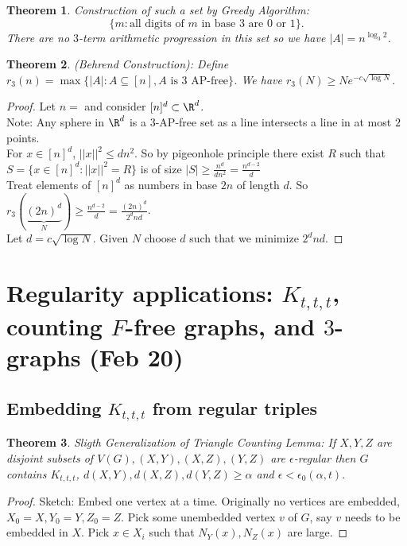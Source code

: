 \documentclass[a4paper]{article}
\newtheorem{thm}{Theorem}[section]
\begin{document}
\begin{thm}
    Construction of such a set by Greedy Algorithm: \[
    \{m: \text{all digits of $m$ in base 3 are 0 or 1}\}
    .\] 
    There are no $3$-term arithmetic progression in this set so we have $|A|=n^{\log_3 2}$. 
\end{thm}
\begin{thm}
    (Behrend Construction): Define $r_3(n)=\max \{|A|: A\subseteq [n], A \text{ is 3 AP-free}\}$. We have $r_3(N)\geq N e^{-c\sqrt{\log N}}$. 
\end{thm}
\begin{proof}
    Let $n=$ and consider $[n]^d\subset \R^d$. \\
    Note: Any sphere in $\R^d$ is a $3$-AP-free set as a line intersects a line in at most $2$ points. \\
    For $x\in [n]^d$, $||x||^2\leq dn^2$. So by pigeonhole principle there exist $R$ such that $S= \{x\in [n]^d: ||x||^2=R\}$ is of size $|S|\geq \frac{n^d}{dn^2}=\frac{n^{d-2}}{d}$\\
    Treat elements of $[n]^d$ as numbers in base $2n$ of length $d$. So $r_3(\underbrace{(2n)^d}_{N})\geq \frac{n^{d-2}}{d}=\frac{(2n)^d}{2^d n d}$. \\
    Let $d=c\sqrt{\log N}$. Given $N$ choose $d$ such that we minimize $2^d n d$. 
\end{proof}
\newpage
\section{Regularity applications: $K_{t,t,t}$, counting $F$-free graphs, and $3$-graphs (Feb 20)}

\subsection{Embedding $K_{t,t,t}$ from regular triples}

\begin{thm}
    Sligth Generalization of Triangle Counting Lemma: If $X,Y,Z$ are disjoint subsets of $V(G), (X,Y),(X,Z),(Y,Z)$ are $\epsilon$-regular then $G$ contains $K_{t,t,t}$, $d(X,Y),d(X,Z),d(Y,Z)\geq \alpha$ and $\epsilon<\epsilon_0(\alpha, t).$ 
\end{thm}
\begin{proof}
    Sketch: Embed one vertex at a time. Originally no vertices are embedded, $X_0=X,Y_0=Y,Z_0=Z$. Pick some unembedded vertex $v$ of $G$, say $v$ needs to be embedded in $X$. Pick $x\in X_i$ such that $N_Y(x),N_Z(x)$ are large. 
\end{proof}
\end{document}
